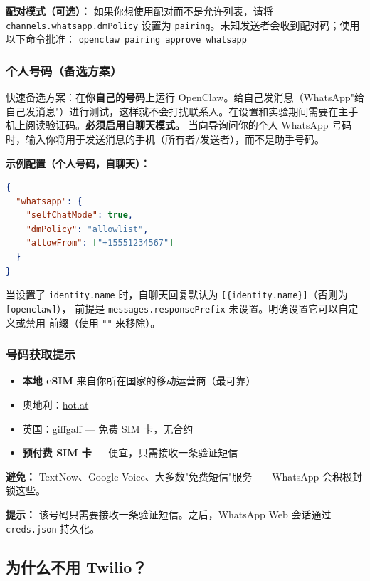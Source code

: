\textbf{配对模式（可选）：}
如果你想使用配对而不是允许列表，请将 \texttt{channels.whatsapp.dmPolicy} 设置为 \texttt{pairing}。未知发送者会收到配对码；使用以下命令批准：
\texttt{openclaw pairing approve whatsapp }

\subsubsection{个人号码（备选方案）}


快速备选方案：在\textbf{你自己的号码}上运行 OpenClaw。给自己发消息（WhatsApp"给自己发消息"）进行测试，这样就不会打扰联系人。在设置和实验期间需要在主手机上阅读验证码。\textbf{必须启用自聊天模式。}
当向导询问你的个人 WhatsApp 号码时，输入你将用于发送消息的手机（所有者/发送者），而不是助手号码。

\textbf{示例配置（个人号码，自聊天）：}

\begin{lstlisting}[language=json]
{
  "whatsapp": {
    "selfChatMode": true,
    "dmPolicy": "allowlist",
    "allowFrom": ["+15551234567"]
  }
}
\end{lstlisting}


当设置了 \texttt{identity.name} 时，自聊天回复默认为 \texttt{[\{identity.name\}]}（否则为 \texttt{[openclaw]}），
前提是 \texttt{messages.responsePrefix} 未设置。明确设置它可以自定义或禁用
前缀（使用 \texttt{""} 来移除）。

\subsubsection{号码获取提示}


\begin{itemize}
  \item \textbf{本地 eSIM} 来自你所在国家的移动运营商（最可靠）
  \item 奥地利：\href{https://www.hot.at}{hot.at}
  \item 英国：\href{https://www.giffgaff.com}{giffgaff} — 免费 SIM 卡，无合约
  \item \textbf{预付费 SIM 卡} — 便宜，只需接收一条验证短信
\end{itemize}


\textbf{避免：} TextNow、Google Voice、大多数"免费短信"服务——WhatsApp 会积极封锁这些。

\textbf{提示：} 该号码只需要接收一条验证短信。之后，WhatsApp Web 会话通过 \texttt{creds.json} 持久化。

\subsection{为什么不用 Twilio？}



